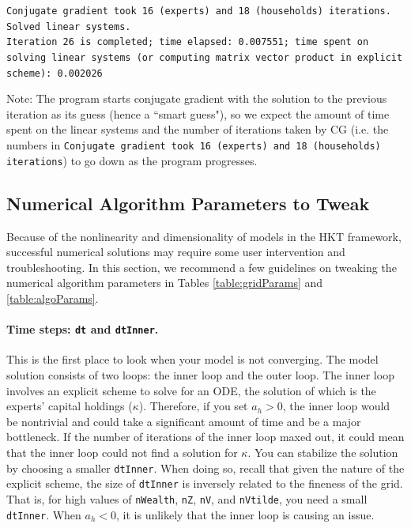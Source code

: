 \documentclass[12pt]{article}
\newcommand{\nWealthProg}{nWealth\xspace}
\newcommand{\nGrowthProg}{nZ\xspace}
\newcommand{\nStochasaticVolProg}{nV\xspace}
\newcommand{\nIdioVolProg}{nVtilde\xspace}
\begin{document}
\begin{flushleft}
\texttt{Conjugate gradient took 16 (experts) and 18 (households) iterations.\\
Solved linear systems.\\
Iteration 26 is completed; time elapsed: 0.007551; time spent on solving linear systems (or computing matrix vector product in explicit scheme): 0.002026}
\end{flushleft}

Note: The program starts conjugate gradient with the solution to the previous iteration as its guess (hence a ``smart guess"), so we expect the amount of time spent on the linear systems and the number of iterations taken by CG (i.e. the numbers in \texttt{Conjugate gradient took 16 (experts) and 18 (households) iterations}) to go down as the program progresses.

\subsection{Numerical Algorithm Parameters to Tweak}\label{sec:algoParamsTweak}

Because of the nonlinearity and dimensionality of models in the HKT framework, successful numerical solutions may require some user intervention and troubleshooting. In this section, we recommend a few guidelines on tweaking the numerical algorithm parameters in Tables \ref{table:gridParams} and \ref{table:algoParams}. 

\paragraph{Time steps: \texttt{dt} and \texttt{dtInner}.} This is the first place to look when your model is not converging. The model solution consists of two loops: the inner loop and the outer loop. The inner loop involves an explicit scheme to solve for an ODE, the solution of which is the experts' capital holdings ($\kappa$). Therefore, if you set $a_h > 0$, the inner loop would be nontrivial and could take a significant amount of time and be a major bottleneck. If the number of iterations of the inner loop maxed out, it could mean that the inner loop could not find a solution for $\kappa$. You can stabilize the solution by choosing a smaller \texttt{dtInner}. When doing so, recall that given the nature of the explicit scheme, the size of \texttt{dtInner} is inversely related to the fineness of the grid. That is, for high values of \texttt{\nWealthProg}, \texttt{\nGrowthProg}, \texttt{\nStochasaticVolProg}, and \texttt{\nIdioVolProg}, you need a small \texttt{dtInner}. When $a_h < 0$, it is unlikely that the inner loop is causing an issue.\\
\end{document}
